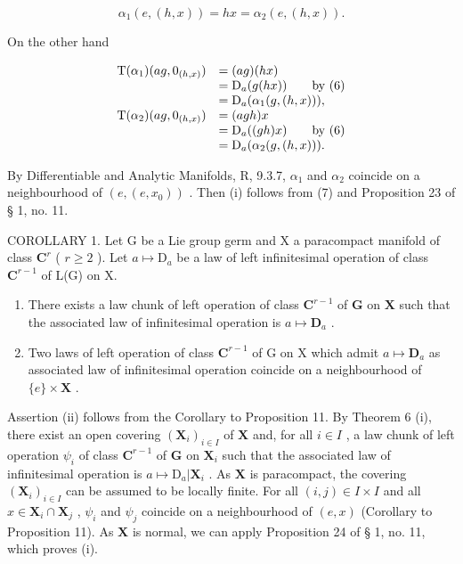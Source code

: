 \[
\alpha_ {1} (e, (h, x)) = h x = \alpha_ {2} (e, (h, x)).
\]

On the other hand

\[
\begin{array}{r l} \mathrm{T} (\alpha_ {1}) (a g, 0 _ {(h, x)}) & = (a g) (h x) \\ & = \mathrm{D} _ {a} (g (h x)) \qquad \text {by (6)} \\ & = \mathrm{D} _ {a} (\alpha_ {1} (g, (h, x))), \\ \mathrm{T} (\alpha_ {2}) (a g, 0 _ {(h, x)}) & = (a g h) x \\ & = \mathrm{D} _ {a} ((g h) x) \qquad \text {by (6)} \\ & = \mathrm{D} _ {a} (\alpha_ {2} (g, (h, x))). \end{array}
\]

By Differentiable and Analytic Manifolds, R, 9.3.7, \(\alpha_{1}\) and \(\alpha_{2}\) coincide on a neighbourhood of \((e, (e, x_{0}))\) . Then (i) follows from (7) and Proposition 23 of § 1, no. 11.

COROLLARY 1. Let G be a Lie group germ and X a paracompact manifold of class \(\mathbf{C}^r\) ( \(r \geqslant 2\) ). Let \(a \mapsto \mathrm{D}_a\) be a law of left infinitesimal operation of class \(\mathbf{C}^{r-1}\) of L(G) on X.

\begin{enumerate}
\def\labelenumi{(\roman{enumi})}
\item
  There exists a law chunk of left operation of class \(\mathbf{C}^{r-1}\) of \(\mathbf{G}\) on \(\mathbf{X}\) such that the associated law of infinitesimal operation is \(a \mapsto \mathbf{D}_a\) .
\item
  Two laws of left operation of class \(\mathbf{C}^{r-1}\) of G on X which admit \(a \mapsto \mathbf{D}_a\) as associated law of infinitesimal operation coincide on a neighbourhood of \(\{e\} \times \mathbf{X}\) .
\end{enumerate}

Assertion (ii) follows from the Corollary to Proposition 11. By Theorem 6 (i), there exist an open covering \((\mathbf{X}_i)_{i\in I}\) of \(\mathbf{X}\) and, for all \(i\in I\) , a law chunk of left operation \(\psi_i\) of class \(\mathbf{C}^{r-1}\) of \(\mathbf{G}\) on \(\mathbf{X}_i\) such that the associated law of infinitesimal operation is \(a\mapsto \mathrm{D}_a|\mathbf{X}_i\) . As \(\mathbf{X}\) is paracompact, the covering \((\mathbf{X}_i)_{i\in I}\) can be assumed to be locally finite. For all \((i,j)\in I\times I\) and all \(x\in \mathbf{X}_i\cap \mathbf{X}_j\) , \(\psi_i\) and \(\psi_j\) coincide on a neighbourhood of \((e,x)\) (Corollary to Proposition 11). As \(\mathbf{X}\) is normal, we can apply Proposition 24 of § 1, no. 11, which proves (i).

